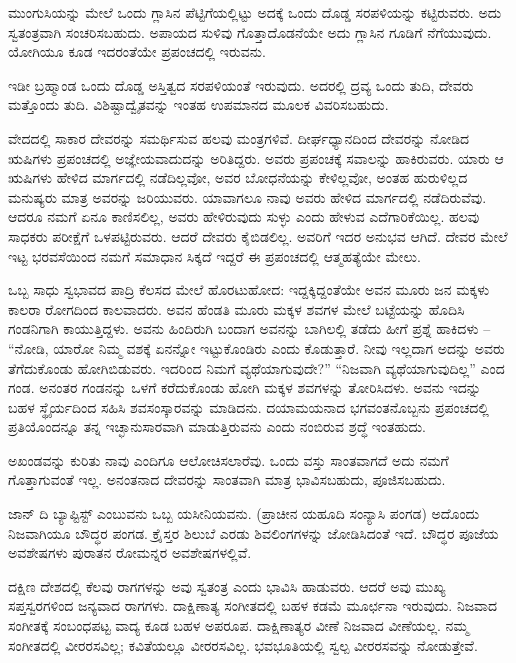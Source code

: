 ಮುಂಗುಸಿಯನ್ನು ಮೇಲೆ ಒಂದು ಗ್ಲಾಸಿನ ಪೆಟ್ಟಿಗೆಯಲ್ಲಿಟ್ಟು ಅದಕ್ಕೆ ಒಂದು ದೊಡ್ಡ ಸರಪಳಿಯನ್ನು ಕಟ್ಟಿರುವರು. ಅದು ಸ್ವತಂತ್ರವಾಗಿ ಸಂಚರಿಸಬಹುದು. ಅಪಾಯದ ಸುಳಿವು ಗೊತ್ತಾದೊಡನೆಯೇ ಅದು ಗ್ಲಾಸಿನ ಗೂಡಿಗೆ ನೆಗೆಯುವುದು. ಯೋಗಿಯೂ ಕೂಡ ಇದರಂತೆಯೇ ಪ್ರಪಂಚದಲ್ಲಿ ಇರುವನು.

ಇಡೀ ಬ್ರಹ್ಮಾಂಡ ಒಂದು ದೊಡ್ಡ ಅಸ್ತಿತ್ವದ ಸರಪಳಿಯಂತೆ ಇರುವುದು. ಅದರಲ್ಲಿ ದ್ರವ್ಯ  ಒಂದು ತುದಿ, ದೇವರು ಮತ್ತೊಂದು ತುದಿ. ವಿಶಿಷ್ಟಾದ್ವೈತವನ್ನು ಇಂತಹ ಉಪಮಾನದ ಮೂಲಕ ವಿವರಿಸಬಹುದು.

ವೇದದಲ್ಲಿ ಸಾಕಾರ ದೇವರನ್ನು ಸಮರ್ಥಿಸುವ ಹಲವು ಮಂತ್ರಗಳಿವೆ. ದೀರ್ಘಧ್ಯಾನದಿಂದ ದೇವರನ್ನು ನೋಡಿದ ಋಷಿಗಳು ಪ್ರಪಂಚದಲ್ಲಿ ಅಜ್ಞೇಯವಾದುದನ್ನು ಅರಿತಿದ್ದರು. ಅವರು ಪ್ರಪಂಚಕ್ಕೆ ಸವಾಲನ್ನು ಹಾಕಿರುವರು. ಯಾರು ಆ ಋಷಿಗಳು ಹೇಳಿದ ಮಾರ್ಗದಲ್ಲಿ ನಡೆದಿಲ್ಲವೋ, ಅವರ ಬೋಧನೆಯನ್ನು ಕೇಳಿಲ್ಲವೋ, ಅಂತಹ ಹುರುಳಿಲ್ಲದ ಮನುಷ್ಯರು ಮಾತ್ರ ಅವರನ್ನು ಜರಿಯುವರು. ಯಾವಾಗಲೂ ನಾವು ಅವರು ಹೇಳಿದ ಮಾರ್ಗದಲ್ಲಿ ನಡೆದಿರುವೆವು. ಆದರೂ ನಮಗೆ ಏನೂ ಕಾಣಿಸಲಿಲ್ಲ, ಅವರು ಹೇಳಿರುವುದು ಸುಳ್ಳು ಎಂದು ಹೇಳುವ ಎದೆಗಾರಿಕೆಯಿಲ್ಲ. ಹಲವು ಸಾಧಕರು ಪರೀಕ್ಷೆಗೆ ಒಳಪಟ್ಟಿರುವರು. ಆದರೆ ದೇವರು ಕೈಬಿಡಲಿಲ್ಲ. ಅವರಿಗೆ ಇದರ ಅನುಭವ ಆಗಿದೆ. ದೇವರ ಮೇಲೆ ಇಟ್ಟ ಭರವಸೆಯಿಂದ ನಮಗೆ ಸಮಾಧಾನ ಸಿಕ್ಕದೆ ಇದ್ದರೆ ಈ ಪ್ರಪಂಚದಲ್ಲಿ ಆತ್ಮಹತ್ಯೆಯೇ ಮೇಲು.

ಒಬ್ಬ ಸಾಧು ಸ್ವಭಾವದ ಪಾದ್ರಿ ಕೆಲಸದ ಮೇಲೆ ಹೊರಟುಹೋದ: ಇದ್ದಕ್ಕಿದ್ದಂತೆಯೇ ಅವನ ಮೂರು ಜನ ಮಕ್ಕಳು ಕಾಲರಾ ರೋಗದಿಂದ ಕಾಲವಾದರು. ಅವನ ಹೆಂಡತಿ ಮೂರು ಮಕ್ಕಳ ಶವಗಳ ಮೇಲೆ ಬಟ್ಟೆಯನ್ನು ಹೊದಿಸಿ ಗಂಡನಿಗಾಗಿ ಕಾಯುತ್ತಿದ್ದಳು. ಅವನು ಹಿಂದಿರುಗಿ ಬಂದಾಗ ಅವನನ್ನು ಬಾಗಿಲಲ್ಲಿ ತಡೆದು ಹೀಗೆ ಪ್ರಶ್ನೆ ಹಾಕಿದಳು – “ನೋಡಿ, ಯಾರೋ ನಿಮ್ಮ ವಶಕ್ಕೆ ಏನನ್ನೋ ಇಟ್ಟುಕೊಂಡಿರು ಎಂದು ಕೊಡುತ್ತಾರೆ. ನೀವು ಇಲ್ಲದಾಗ ಅದನ್ನು ಅವರು ತೆಗೆದುಕೊಂಡು ಹೋಗಿಬಿಡುವರು. ಇದರಿಂದ ನಿಮಗೆ ವ್ಯಥೆಯಾಗುವುದೇ?” “ನಿಜವಾಗಿ ವ್ಯಥೆಯಾಗುವುದಿಲ್ಲ” ಎಂದ ಗಂಡ. ಅನಂತರ ಗಂಡನನ್ನು ಒಳಗೆ ಕರೆದುಕೊಂಡು ಹೋಗಿ ಮಕ್ಕಳ ಶವಗಳನ್ನು ತೋರಿಸಿದಳು. ಅವನು ಇದನ್ನು ಬಹಳ ಸ್ಥೈರ್ಯದಿಂದ ಸಹಿಸಿ ಶವಸಂಸ್ಕಾರವನ್ನು ಮಾಡಿದನು. ದಯಾಮಯನಾದ ಭಗವಂತನೊಬ್ಬನು ಪ್ರಪಂಚದಲ್ಲಿ ಪ್ರತಿಯೊಂದನ್ನೂ ತನ್ನ ಇಚ್ಛಾನುಸಾರವಾಗಿ ಮಾಡುತ್ತಿರುವನು ಎಂದು ನಂಬಿರುವ ಶ್ರದ್ಧೆ ಇಂತಹುದು.

ಅಖಂಡವನ್ನು ಕುರಿತು ನಾವು ಎಂದಿಗೂ ಆಲೋಚಿಸಲಾರೆವು. ಒಂದು ವಸ್ತು ಸಾಂತವಾಗದೆ ಅದು ನಮಗೆ ಗೊತ್ತಾಗುವಂತೆ ಇಲ್ಲ. ಅನಂತನಾದ ದೇವರನ್ನು ಸಾಂತವಾಗಿ ಮಾತ್ರ ಭಾವಿಸಬಹುದು, ಪೂಜಿಸಬಹುದು.

ಜಾನ್ ದಿ ಬ್ಯಾಪ್ಟಿಸ್ಟ್ ಎಂಬುವನು ಒಬ್ಬ ಯಸೀನಿಯವನು. (ಪ್ರಾಚೀನ ಯಹೂದಿ ಸಂನ್ಯಾಸಿ ಪಂಗಡ) ಅದೊಂದು ನಿಜವಾಗಿಯೂ ಬೌದ್ಧರ ಪಂಗಡ. ಕ್ರೈಸ್ತರ ಶಿಲುಬೆ ಎರಡು ಶಿವಲಿಂಗಗಳನ್ನು ಜೋಡಿಸಿದಂತೆ ಇದೆ. ಬೌದ್ಧರ ಪೂಜೆಯ ಅವಶೇಷಗಳು ಪುರಾತನ ರೋಮನ್ನರ ಅವಶೇಷಗಳಲ್ಲಿವೆ.

ದಕ್ಷಿಣ ದೇಶದಲ್ಲಿ ಕೆಲವು ರಾಗಗಳನ್ನು ಅವು ಸ್ವತಂತ್ರ ಎಂದು ಭಾವಿಸಿ ಹಾಡುವರು. ಆದರೆ ಅವು ಮುಖ್ಯ ಸಪ್ತಸ್ವರಗಳಿಂದ ಜನ್ಯವಾದ ರಾಗಗಳು. ದಾಕ್ಷಿಣಾತ್ಯ ಸಂಗೀತದಲ್ಲಿ ಬಹಳ ಕಡಮೆ ಮೂರ್ಛನಾ ಇರುವುದು. ನಿಜವಾದ ಸಂಗೀತಕ್ಕೆ ಸಂಬಂಧಪಟ್ಟ ವಾದ್ಯ ಕೂಡ ಬಹಳ ಅಪರೂಪ. ದಾಕ್ಷಿಣಾತ್ಯರ ವೀಣೆ ನಿಜವಾದ ವೀಣೆಯಲ್ಲ. ನಮ್ಮ ಸಂಗೀತದಲ್ಲಿ ವೀರರಸವಿಲ್ಲ; ಕವಿತೆಯಲ್ಲೂ ವೀರರಸವಿಲ್ಲ. ಭವಭೂತಿಯಲ್ಲಿ ಸ್ವಲ್ಪ ವೀರರಸವನ್ನು ನೋಡುತ್ತೇವೆ.

\delimiter

